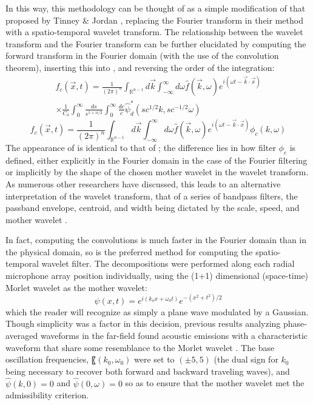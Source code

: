 In this way, this methodology can be thought of as a simple modification of that proposed by Tinney \& Jordan \citep{Tinney2008}, replacing the Fourier transform in their method with a spatio-temporal wavelet transform. 
The relationship between the wavelet transform and the Fourier transform can be further elucidated by computing the forward transform in the Fourier domain (with the use of the convolution theorem), inserting this into , and reversing the order of the integration:
\begin{multline}
		f_c (\vec{x},t) = \frac{1}{(2 \pi)^n} \int_{\mathbb{R}^{n-1}} d \vec{k} \int_{-\infty}^{\infty} d\omega \hat{f}(\vec{k},\omega) e^{i(\omega t - \vec{k} \cdot \vec{x})} \\ 
		\times \frac{1}{C_\delta} \int_0^\infty \frac{ds}{s^{1 + n/2}} \int_{0}^{\infty} \frac{dc}{c} \hat{\psi}_d^* (sc^{1/2}k,sc^{-1/2} \omega)
\end{multline}
\begin{equation}
	f_c (\vec{x},t) = \frac{1}{(2 \pi)^n} \int_{\mathbb{R}^{n-1}} d \vec{k} \int_{-\infty}^{\infty} d\omega \hat{f}(\vec{k},\omega) e^{i(\omega t - \vec{k} \cdot \vec{x})} \phi_c (k,\omega)
	\label{eq:wavelet_filter_simplified}
\end{equation}
The appearance of  is identical to that of ; the difference lies in how filter $\phi_c$ is defined, either explicitly in the Fourier domain in the case of the Fourier filtering or implicitly by the shape of the chosen mother wavelet in the wavelet transform. 
As numerous other researchers have discussed, this leads to an alternative interpretation of the wavelet transform, that of a series of bandpass filters, the passband envelope, centroid, and width being dictated by the scale, speed, and mother wavelet \citep{Farge1992,Torrence1998}.

In fact, computing the convolutions is much faster in the Fourier domain than in the physical domain, so  is the preferred method for computing the spatio-temporal wavelet filter.
The decompositions were performed along each radial microphone array position individually, using the (1+1) dimensional (space-time) Morlet wavelet as the mother wavelet:
\begin{equation}
	\psi (x,t) = e^{i(k_o x + \omega_0 t)} e^{-(x^2 + t^2)/2}
\end{equation}
which the reader will recognize as simply a plane wave modulated by a Gaussian. 
Though simplicity was a factor in this decision, previous results analyzing phase-averaged waveforms in the far-field found acoustic emissions with a characteristic waveform that share some resemblance to the Morlet wavelet \citep{Crawley2015}. 
The base oscillation frequencies, 〖$(k_0,\omega_0)$ were set to $(\pm 5,5)$ (the dual sign for $k_0$ being necessary to recover both forward and backward traveling waves), and $\hat{\psi}(k,0) = 0$ and $\hat{\psi}(0,\omega) = 0$ so as to ensure that the mother wavelet met the admissibility criterion.

